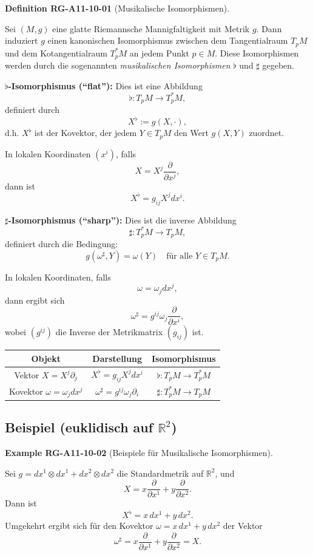 \documentclass[10pt, letterpaper]{article}
\newcommand{\CustomHeading}[3]{%
  \par\medskip\noindent%
  \textbf{#1 #2} \textnormal{(#3)}.\enskip%
}
\newenvironment{DEF}[2]{\begin{unitbox}\CustomHeading{Definition}{#1}{#2}}{\end{unitbox}}
\newenvironment{EXA}[2]{\begin{unitbox}\CustomHeading{Example}{#1}{#2}}{\end{unitbox}}
\begin{document}
\begin{DEF}{RG-A11-10-01}{Musikalische Isomorphismen}
Sei \( (M, g) \) eine glatte Riemannsche Mannigfaltigkeit mit Metrik \( g \). Dann induziert \( g \) einen kanonischen Isomorphismus zwischen dem Tangentialraum \( T_p M \) und dem Kotangentialraum \( T_p^* M \) an jedem Punkt \( p \in M \). Diese Isomorphismen werden durch die sogenannten \emph{musikalischen Isomorphismen} \(\flat\) und \(\sharp\) gegeben.

\textbf{\( \flat \)-Isomorphismus (``flat''):} Dies ist eine Abbildung
\[
\flat: T_p M \longrightarrow T_p^* M,
\]
definiert durch
\[
X^\flat := g(X, \cdot),
\]
d.h. \( X^\flat \) ist der Kovektor, der jedem \( Y \in T_p M \) den Wert \( g(X, Y) \) zuordnet.

In lokalen Koordinaten \( (x^i) \), falls
\[
X = X^j \frac{\partial}{\partial x^j},
\]
dann ist
\[
X^\flat = g_{ij} X^j dx^i.
\]

\textbf{\( \sharp \)-Isomorphismus (``sharp''):} Dies ist die inverse Abbildung
\[
\sharp: T_p^* M \longrightarrow T_p M,
\]
definiert durch die Bedingung:
\[
g(\omega^\sharp, Y) = \omega(Y) \quad \text{für alle } Y \in T_p M.
\]

In lokalen Koordinaten, falls
\[
\omega = \omega_j dx^j,
\]
dann ergibt sich
\[
\omega^\sharp = g^{ij} \omega_j \frac{\partial}{\partial x^i},
\]
wobei \( (g^{ij}) \) die Inverse der Metrikmatrix \( (g_{ij}) \) ist.

\begin{center}
\begin{tabular}{|c|c|c|}
\hline
\textbf{Objekt} & \textbf{Darstellung} & \textbf{Isomorphismus} \\
\hline
Vektor \( X = X^j \partial_j \) & \( X^\flat = g_{ij} X^j dx^i \) & \( \flat: T_p M \to T_p^* M \) \\
\hline
Kovektor \( \omega = \omega_j dx^j \) & \( \omega^\sharp = g^{ij} \omega_j \partial_i \) & \( \sharp: T_p^* M \to T_p M \) \\
\hline
\end{tabular}
\end{center}
\end{DEF}


\subsection*{Beispiel (euklidisch auf \( \mathbb{R}^2 \))}

\begin{EXA}{RG-A11-10-02}{Beispiele für Musikalische Isomorphismen}
Sei \( g = dx^1 \otimes dx^1 + dx^2 \otimes dx^2 \) die Standardmetrik auf \( \mathbb{R}^2 \), und
\[
X = x \frac{\partial}{\partial x^1} + y \frac{\partial}{\partial x^2}.
\]
Dann ist
\[
X^\flat = x \, dx^1 + y \, dx^2.
\]
Umgekehrt ergibt sich für den Kovektor \( \omega = x \, dx^1 + y \, dx^2 \) der Vektor
\[
\omega^\sharp = x \frac{\partial}{\partial x^1} + y \frac{\partial}{\partial x^2} = X.
\]
\end{EXA}
\end{document}
